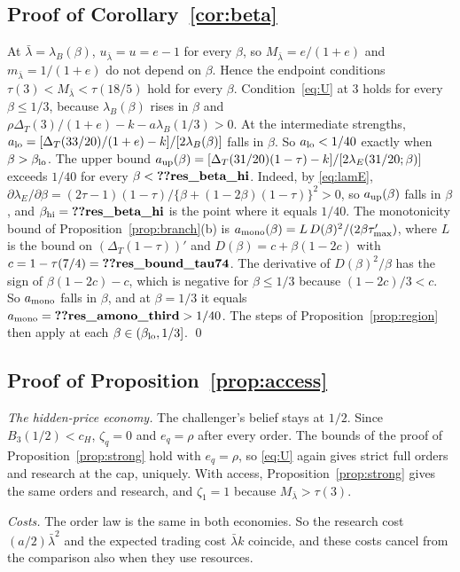 \documentclass[12pt]{article}
\theoremstyle{definition}
\theoremstyle{remark}
\newcommand{\DT}{\Delta_T}
\newcommand{\lb}{\bar\lambda}
\begin{document}
\subsection{Proof of Corollary~\ref{cor:beta}}

At $\lb=\lambda_B(\beta)$, $u_{\lb}=u=e-1$ for every $\beta$, so $M_{\lb}=e/(1+e)$ and $m_{\lb}=1/(1+e)$ do not
depend on $\beta$. Hence the endpoint conditions $\tau(3)<M_{\lb}<\tau(18/5)$ hold for every $\beta$.
Condition~\eqref{eq:U} at $3$ holds for every $\beta\le1/3$, because $\lambda_B(\beta)$ rises in $\beta$ and
$\rho\DT(3)/(1+e)-k-a\lambda_B(1/3)>0$. At the intermediate strengths,
$a_{\rm lo}=[\DT(33/20)/(1+e)-k]/[2\lambda_B(\beta)]$ falls in $\beta$. So $a_{\rm lo}<1/40$ exactly when
$\beta>\beta_{\rm lo}$. The upper bound $a_{\rm up}(\beta)=[\DT(31/20)(1-\tau)-k]/[2\lambda_E(31/20;\beta)]$ exceeds
$1/40$ for every $\beta<\reg{res_beta_hi}$. Indeed, by \eqref{eq:lamE},
$\partial\lambda_E/\partial\beta=(2\tau-1)(1-\tau)/\{\beta+(1-2\beta)(1-\tau)\}^2>0$, so $a_{\rm up}(\beta)$ falls in
$\beta$, and $\beta_{\rm hi}=\reg{res_beta_hi}$ is the point where it equals $1/40$. The monotonicity bound of
Proposition~\ref{prop:branch}(b) is $a_{\rm mono}(\beta)=L\,D(\beta)^2/(2\beta\tau'_{\max})$, where $L$ is the bound on
$(\DT(1-\tau))'$ and $D(\beta)=c+\beta(1-2c)$ with $c=1-\tau(7/4)=\reg{res_bound_tau74}$. The derivative of
$D(\beta)^2/\beta$ has the sign of $\beta(1-2c)-c$, which is negative for $\beta\le1/3$ because
$(1-2c)/3<c$. So $a_{\rm mono}$ falls in $\beta$, and at $\beta=1/3$ it equals $a_{\rm mono}=\reg{res_amono_third}>1/40$. The steps of Proposition~\ref{prop:region} then
apply at each $\beta\in(\beta_{\rm lo},1/3]$. \qed

\subsection{Proof of Proposition~\ref{prop:access}}

\emph{The hidden-price economy.} The challenger's belief stays at $1/2$. Since $B_3(1/2)<c_H$, $\zeta_q=0$ and
$e_q=\rho$ after every order. The bounds of the proof of Proposition~\ref{prop:strong} hold with $e_q=\rho$, so
\eqref{eq:U} again gives strict full orders and research at the cap, uniquely. With access,
Proposition~\ref{prop:strong} gives the same orders and research, and $\zeta_1=1$ because $M_{\lb}>\tau(3)$.

\emph{Costs.} The order law is the same in both economies. So the research cost $(a/2)\lb^2$ and the expected trading
cost $\lb k$ coincide, and these costs cancel from the comparison also when they use resources.
\end{document}
